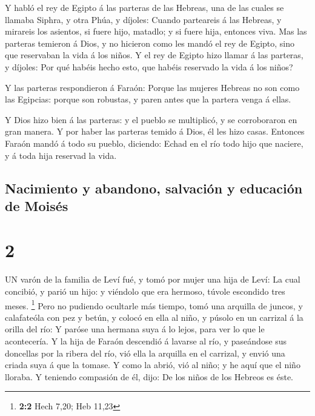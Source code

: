  Y habló el rey de Egipto á las parteras de las Hebreas,
una de las cuales se llamaba Siphra, y otra Phúa, y díjoles:
 Cuando parteareis á las Hebreas, y mirareis los asientos,
si fuere hijo, matadlo; y si fuere hija, entonces viva. 
Mas las parteras temieron á Dios, y no hicieron como les mandó el rey de
Egipto, sino que reservaban la vida á los niños.  Y el rey
de Egipto hizo llamar á las parteras, y díjoles: Por qué habéis hecho
esto, que habéis reservado la vida á los niños?

 Y las parteras respondieron á Faraón: Porque las mujeres
Hebreas no son como las Egipcias: porque son robustas, y paren antes que
la partera venga á ellas.

 Y Dios hizo bien á las parteras: y el pueblo se
multiplicó, y se corroboraron en gran manera.  Y por haber
las parteras temido á Dios, él les hizo casas.  Entonces
Faraón mandó á todo su pueblo, diciendo: Echad en el río todo hijo que
naciere, y á toda hija reservad la vida.

\hypertarget{nacimiento-y-abandono-salvaciuxf3n-y-educaciuxf3n-de-moisuxe9s}{%
\subsection{Nacimiento y abandono, salvación y educación de
Moisés}\label{nacimiento-y-abandono-salvaciuxf3n-y-educaciuxf3n-de-moisuxe9s}}

\hypertarget{section-1}{%
\section{2}\label{section-1}}

 UN varón de la familia de Leví fué, y tomó por mujer una
hija de Leví:  La cual concibió, y parió un hijo: y viéndolo
que era hermoso, túvole escondido tres meses. \footnote{\textbf{2:2}
  Hech 7,20; Heb 11,23}  Pero no pudiendo ocultarle más
tiempo, tomó una arquilla de juncos, y calafateóla con pez y betún, y
colocó en ella al niño, y púsolo en un carrizal á la orilla del río:
 Y paróse una hermana suya á lo lejos, para ver lo que le
acontecería.  Y la hija de Faraón descendió á lavarse al
río, y paseándose sus doncellas por la ribera del río, vió ella la
arquilla en el carrizal, y envió una criada suya á que la tomase.
 Y como la abrió, vió al niño; y he aquí que el niño
lloraba. Y teniendo compasión de él, dijo: De los niños de los Hebreos
es éste.

